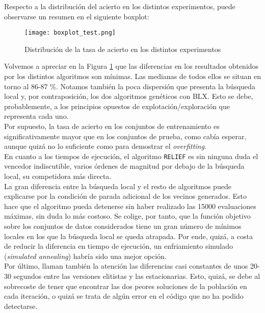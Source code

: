 \documentclass[11pt]{article}
\theoremstyle{plain}
\theoremstyle{definition}
\begin{document}
Respecto a la distribución del acierto en los distintos experimentos, puede observarse un resumen en el siguiente boxplot:

\begin{figure}[H]
\centering
\texttt{[image: boxplot\_test.png]}
\caption{Distribución de la tasa de acierto en los distintos experimentos}
\label{fig:boxplot}
\end{figure}

Volvemos a apreciar en la Figura \ref{fig:boxplot} que las diferencias en los resultados obtenidos por los distintos algoritmos son mínimas. Las medianas de todos ellos se situan en torno al 86-87 \%. Notamos también la poca dispersión que presenta la búsqueda local y, por contraposición, los dos algoritmos genéticos con BLX. Esto se debe, probablemente, a los principios opuestos de explotación/exploración que representa cada uno. \\

Por supuesto, la tasa de acierto en los conjuntos de entrenamiento es significativamente mayor que en los conjuntos de prueba, como cabía esperar, aunque quizá no lo suficiente como para demostrar el \textit{overfitting}. \\

En cuanto a los tiempos de ejecución, el algoritmo \texttt{RELIEF} es sin ninguna duda el vencedor indiscutible, varios órdenes de magnitud por debajo de la búsqueda local, su competidora más directa. \\

La gran diferencia entre la búsqueda local y el resto de algoritmos puede explicarse por la condición de parada adicional de los vecinos generados. Esto hace que el algoritmo pueda detenerse sin haber realizado las 15000 evaluaciones máximas, sin duda lo más costoso. Se colige, por tanto, que la función objetivo sobre los conjuntos de datos considerados tiene un gran número de mínimos locales en los que la búsqueda local se queda atrapada. Por ende, quizá, a costa de reducir la diferencia en tiempo de ejecución, un enfriamiento simulado (\textit{simulated annealing}) habría sido una mejor opción. \\

Por último, llaman también la atención las diferencias casi constantes de unos 20-30 segundos entre las versiones elitistas y las estacionarias. Esto, quizá, se debe al sobrecoste de tener que encontrar las dos peores soluciones de la población en cada iteración, o quizá se trata de algún error en el código que no ha podido detectarse. \\
\end{document}
